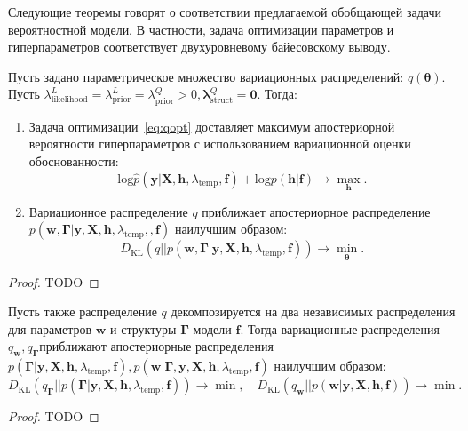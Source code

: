 Следующие теоремы говорят о соответствии предлагаемой обобщающей задачи вероятностной модели. В частности, задача оптимизации параметров и гиперпараметров соответствует двухуровневому байесовскому выводу.
\begin{theorem}
Пусть задано параметрическое множество вариационных распределений: $q(\boldsymbol{\theta})$. 
Пусть ${\lambda^L_\text{likelihood}} = {\lambda^L_\text{prior}=\lambda^Q_\text{prior}}>0, {\boldsymbol{\lambda}^Q_{\text{struct}}}=\mathbf{0}$. Тогда:
\begin{enumerate}
\item Задача оптимизации~\eqref{eq:qopt} доставляет максимум апостериорной вероятности гиперпараметров с использованием вариационной оценки обоснованности:
\vspace{-0.3cm}
\[
    \text{log}\hat{p}(\mathbf{y}|\mathbf{X}, \mathbf{h}, \lambda_\text{temp}, \mathbf{f})+{\text{log}p(\mathbf{h}|\mathbf{f})} \to \max_{\mathbf{h}}.
\]
\item Вариационное распределение $q$ приближает апостериорное распределение $p(\mathbf{w}, \boldsymbol{\Gamma}|\mathbf{y}, \mathbf{X}, \mathbf{h}, \lambda_\text{temp},, \mathbf{f})$ наилучшим образом:
\vspace{-0.3cm}
\[
    {D}_\text{KL}(q||p(\mathbf{w}, \boldsymbol{\Gamma}|\mathbf{y}, \mathbf{X}, \mathbf{h}, \lambda_\text{temp}, \mathbf{f})) \to \min_{\boldsymbol{\theta}}.
\]
\end{enumerate}
\end{theorem}
\begin{proof}
TODO
\end{proof}
\begin{theorem}
Пусть также распределение $q$ декомпозируется на два независимых распределения для параметров $\mathbf{w}$ и структуры $\boldsymbol{\Gamma}$ модели $\mathbf{f}$.
Тогда вариационные распределения $q_{\mathbf{w}}, q_{\boldsymbol{\Gamma}}$приближают апостериорные распределения $ p(\boldsymbol{\Gamma}|\mathbf{y}, \mathbf{X}, \mathbf{h}, \lambda_\text{temp}, \mathbf{f}), p(\mathbf{w}|\boldsymbol{\Gamma},\mathbf{y}, \mathbf{X}, \mathbf{h}, \lambda_\text{temp}, \mathbf{f})$ наилучшим образом:
\[
    {D}_\text{KL}(q_{\boldsymbol{\Gamma}}||p(\boldsymbol{\Gamma}|\mathbf{y}, \mathbf{X}, \mathbf{h}, \lambda_\text{temp}, \mathbf{f})) \to \min, \quad
    {D}_\text{KL}(q_{\mathbf{w}}||p(\mathbf{w}|\mathbf{y}, \mathbf{X}, \mathbf{h}, \mathbf{f})) \to \min.
\]
\end{theorem}
\begin{proof}
TODO
\end{proof}

